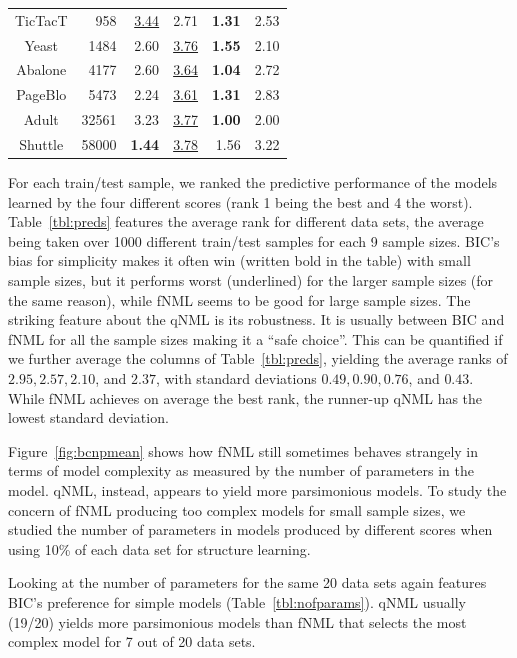 \begin{table}
\begin{center}
\begin{tabular}{crrrrr}
 TicTacT &    958 &  \underline{3.44} &              2.71 &     \textbf{1.31} &           2.53 \\
   Yeast &   1484 &              2.60 &  \underline{3.76} &     \textbf{1.55} &           2.10 \\
 Abalone &   4177 &              2.60 &  \underline{3.64} &     \textbf{1.04} &           2.72 \\
 PageBlo &   5473 &              2.24 &  \underline{3.61} &     \textbf{1.31} &           2.83 \\
   Adult &  32561 &              3.23 &  \underline{3.77} &     \textbf{1.00} &           2.00 \\
 Shuttle &  58000 &     \textbf{1.44} &  \underline{3.78} &              1.56 &           3.22 \\
\end{tabular}
\end{center}
\end{table}

For each train/test sample, we ranked the predictive performance of
the models learned by the four different scores (rank
1 being the best and 4 the worst). Table~\ref{tbl:preds} features the
average rank for different data sets, the average being taken over
1000 different train/test samples for each 9 sample sizes.
BIC's bias for simplicity makes it often win (written bold in
the table) with small sample sizes, but it performs worst
(underlined) for the larger sample sizes (for the same reason), while
fNML seems to be good for large sample sizes. The striking feature
about the qNML is its robustness.  It is usually between BIC and fNML
for all the sample sizes making it a ``safe choice''. This can be
quantified if we further average the columns of
Table~\ref{tbl:preds}, yielding the average ranks of $2.95, 2.57,
2.10$, and $2.37$, with standard deviations $0.49, 0.90, 0.76$, and
$0.43$.  While fNML achieves on average the best rank, the runner-up
qNML has the lowest standard deviation.

Figure~\ref{fig:bcnpmean} shows how fNML still sometimes behaves
strangely in terms of model complexity as measured by the number of
parameters in the model. qNML, instead, appears to yield more
parsimonious models. To study the concern of fNML producing too
complex models for small sample sizes, we studied the number of
parameters in models produced by different scores when using
10\% of each data set for structure learning.

Looking at the number of parameters for the same 20 data sets again
features BIC's preference for simple models
(Table~\ref{tbl:nofparams}).  qNML usually (19/20) yields more
parsimonious models than fNML that selects the most complex model for
7 out of 20 data sets.

